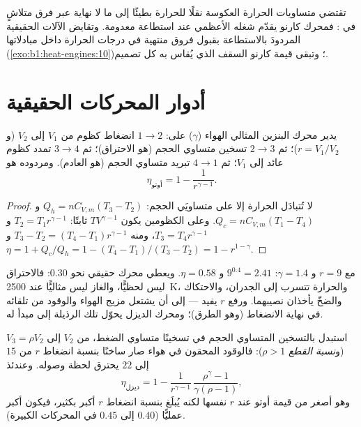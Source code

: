 \begin{remark}\label{rem:b1:heat-engines:notengine}
تقتضي متساويات الحرارة العكوسة نقلًا للحرارة بطيئًا إلى ما لا نهاية عبر
فرق متلاشٍ في : فمحرك كارنو يقدّم شغله الأعظمي
عند استطاعة معدومة. وتقايض الآلات الحقيقية المردودَ بالاستطاعة بقبول
فروق منتهية في درجات الحرارة داخل مبادلاتها
(\cref{exo:b1:heat-engines:10})؛ وتبقى قيمة كارنو السقف الذي
يُقاس به كل تصميم.
\end{remark}

\section{أدوار المحركات الحقيقية}

\begin{proposition}\label{prop:b1:heat-engines:otto}
يدير محرك البنزين المثالي الهواء ($\gamma$) على: $1 \to 2$
انضغاط كظوم من $V_1$ إلى $V_2$ (و\emph{}
$r = V_1/V_2$)؛ ثم $2 \to 3$ تسخين متساوي الحجم (هو الاحتراق)؛ ثم $3 \to 4$
تمدد كظوم عائد إلى $V_1$؛ ثم $4 \to 1$ تبريد متساوي الحجم (هو
العادم). ومردوده هو
\[
\eta_{\text{أوتو}} = 1 - \frac{1}{r^{\gamma-1}} .
\]
\end{proposition}

\begin{proof}
لا تُتبادَل الحرارة إلا على متساويَي الحجم: $Q_h = nC_{V,m}(T_3 - T_2)$ و
$Q_c = nC_{V,m}(T_1 - T_4)$. وعلى الكظومين يكون $TV^{\gamma-1}$ ثابتًا:
$T_2 = T_1r^{\gamma-1}$ و $T_3 = T_4r^{\gamma-1}$، ومنه $T_3 - T_2 =
(T_4 - T_1)r^{\gamma-1}$ و
$\eta = 1 + Q_c/Q_h = 1 - (T_4 - T_1)/(T_3 - T_2) = 1 - r^{1-\gamma}$.
\end{proof}

\begin{example}\label{ex:b1:heat-engines:ottonumbers}
مع $r = 9$ و $\gamma = 1.4$: $9^{0.4} = 2.41$ و $\eta = 0.58$. ويعطي محرك حقيقي
نحو $0.30$: فالاحتراق ليس لحظيًّا، والغاز ليس
مثاليًّا عند \qty{2500}{K}، والحرارة تتسرب إلى الجدران، والاحتكاك والضخّ
يأخذان نصيبهما. ورفع $r$ يفيد --- إلى أن يشتعل مزيج الهواء والوقود
من تلقائه في نهاية الانضغاط (وهو الطرق)؛ ومحرك الديزل
يحوّل تلك الرذيلة إلى مبدأ له.
\end{example}

\begin{proposition}\label{prop:b1:heat-engines:diesel}
استبدل بالتسخين المتساوي الحجم في  تسخينًا متساوي الضغط، من
$V_2$ إلى $V_3 = \rho V_2$ (و\emph{نسبة القطع} $\rho > 1$): فالوقود المحقون
في هواء صار ساخنًا بنسبة انضغاط $r$ من $15$ إلى $22$ يحترق
لحظة وصوله. وعندئذ
\[
\eta_{\text{ديزل}} = 1 - \frac{1}{r^{\gamma-1}}\,\frac{\rho^{\gamma} - 1}{\gamma(\rho - 1)} ,
\]
وهو أصغر من قيمة أوتو عند $r$ نفسها لكنه يُبلَغ بنسبة انضغاط $r$ أكبر بكثير،
فيكون أكبر عمليًّا ($0.40$ إلى $0.45$ في المحركات الكبيرة).
\end{proposition}

